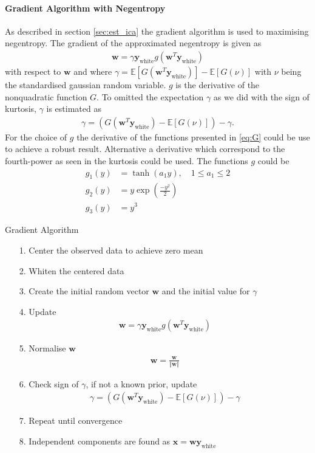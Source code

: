 \paragraph{Gradient Algorithm with Negentropy}
As described in section \ref{sec:est_ica} the gradient algorithm is used to maximising negentropy. The gradient of the approximated negentropy is given as
\begin{align*}
\mathbf{w} = \gamma \mathbf{y}_{\text{white}} g(\mathbf{w}^T \mathbf{y}_{\text{white}})
\end{align*}
with respect to $\mathbf{w}$ and where $\gamma = \mathbb{E}[G(\mathbf{w}^T \mathbf{y}_{\text{white}})] - \mathbb{E}[G(\nu)]$ with $\nu$ being the standardised gaussian random variable. $g$ is the derivative of the nonquadratic function $G$. To omitted the expectation $\gamma$ as we did with the sign of kurtosis, $\gamma$ is estimated as
\begin{align*}
\gamma = (G(\mathbf{w}^T \mathbf{y}_{\text{white}}) - \mathbb{E}[G(\nu)]) - \gamma.
\end{align*}
For the choice of $g$ the derivative of the functions presented in \eqref{eq:G} could be use to achieve a robust result. Alternative a derivative which correspond to the fourth-power as seen in the kurtosis could be used. The functions $g$ could be
\begin{align}\label{eq:G}
g_1 (y) &= \tanh (a_1 y), \quad 1 \leq a_1 \leq 2 \\
g_2 (y) &= y \exp\left( \frac{-y^2}{2} \right) \nonumber \\
g_3 (y) &= y^3 \nonumber
\end{align}

\begin{algorithm}[H]
\caption{Gradient Algorithm}
\begin{itemize}
\item[1.] Center the observed data to achieve zero mean
\item[2.] Whiten the centered data
\item[3.] Create the initial random vector $\mathbf{w}$ and the initial value for $\gamma$
\item[4.] Update
\begin{align*}
\mathbf{w} = \gamma \mathbf{y}_{\text{white}} g(\mathbf{w}^T \mathbf{y}_{\text{white}})
\end{align*}
\item[5.] Normalise $\mathbf{w}$
\begin{align*}
\mathbf{w} = \frac{\mathbf{w}}{\Vert \mathbf{w} \Vert}
\end{align*}
\item[6.] Check sign of $\gamma$, if not a known prior, update
\begin{align*}
\gamma = (G(\mathbf{w}^T \mathbf{y}_{\text{white}}) - \mathbb{E}[G(\nu)]) - \gamma
\end{align*}
\item[7.] Repeat until convergence
\item[8.] Independent components are found as $\mathbf{x} = \mathbf{w} \mathbf{y}_{\text{white}}$
\end{itemize}
\end{algorithm}

